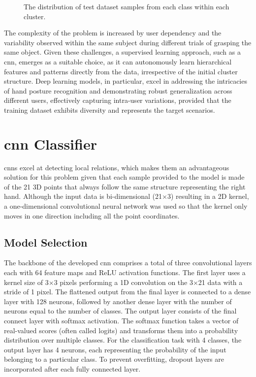 \begin{figure}[ht]
    \centering
    {\fontsize{10}{12}\selectfont}
    \caption{The distribution of test dataset samples from each class within each cluster.}
    \label{fig:kmeans_matrix}
\end{figure}

The complexity of the problem is increased by user dependency and the variability observed within the same subject during different trials of grasping the same object. Given these challenges, a supervised learning approach, such as a \acs{cnn}, emerges as a suitable choice, as it can autonomously learn hierarchical features and patterns directly from the data, irrespective of the initial cluster structure. Deep learning models, in particular, excel in addressing the intricacies of hand posture recognition and demonstrating robust generalization across different users, effectively capturing intra-user variations, provided that the training dataset exhibits diversity and represents the target scenarios.

\section{\acl{cnn} Classifier}
\label{section:cnn_classifier}

\acfp{cnn} excel at detecting local relations, which makes them an advantageous solution for this problem given that each sample provided to the model is made of the 21 3D points that always follow the same structure representing the right hand. Although the input data is bi-dimensional (21$\times$3) resulting in a 2D kernel, a one-dimensional convolutional neural network was used so that the kernel only moves in one direction including all the point coordinates.

\subsection{Model Selection}

The backbone of the developed \acs{cnn} comprises a total of three convolutional layers each with 64 feature maps and ReLU activation functions. 
The first layer uses a kernel size of 3$\times$3 pixels performing a 1D convolution on the 3$\times$21 data with a stride of 1 pixel. The flattened output from the final layer is connected to a dense layer with 128 neurons, followed by another dense layer with the number of neurons equal to the number of classes. The output layer consists of the final connect layer with softmax activation. The softmax function takes a vector of real-valued scores (often called logits) and transforms them into a probability distribution over multiple classes. For the classification task with 4 classes, the output layer has 4 neurons, each representing the probability of the input belonging to a particular class. To prevent overfitting, dropout layers are incorporated after each fully connected layer.


